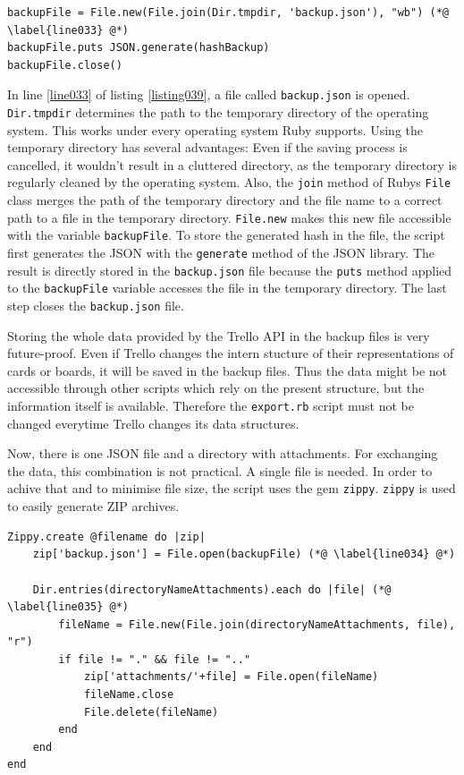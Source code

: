 \begin{lstlisting}[aboveskip=1\baselineskip, caption=Using the temporary directory of the operating system to save the JSON to file., label=listing039]
backupFile = File.new(File.join(Dir.tmpdir, 'backup.json'), "wb") (*@ \label{line033} @*)
backupFile.puts JSON.generate(hashBackup)
backupFile.close()
\end{lstlisting}

In line \ref{line033} of listing \ref{listing039}, a file called \texttt{backup.json} is opened. \lstinline{Dir.tmpdir} determines the path to the temporary directory of the operating system. This works under every operating system Ruby supports. Using the temporary directory has several advantages: Even if the saving process is cancelled, it wouldn't result in a cluttered directory, as the temporary directory is regularly cleaned by the operating system. Also, the \lstinline{join} method of Rubys \lstinline{File} class merges the path of the temporary directory and the file name to a correct path to a file in the temporary directory. \lstinline{File.new} makes this new file accessible with the variable \lstinline{backupFile}. To store the generated hash in the file, the script first generates the JSON with the \lstinline{generate} method of the JSON library. The result is directly stored in the \texttt{backup.json} file because the \lstinline{puts} method applied to the \lstinline{backupFile} variable accesses the file in the temporary directory. The last step closes the \texttt{backup.json} file.

Storing the whole data provided by the Trello API in the backup files is very future-proof. Even if Trello changes the intern stucture of their representations of cards or boards, it will be saved in the backup files. Thus the data might be not accessible through other scripts which rely on the present structure, but the information itself is available. Therefore the \texttt{export.rb} script must not be changed everytime Trello changes its data structures.

Now, there is one JSON file and a directory with attachments. For exchanging the data, this combination is not practical. A single file is needed. In order to achive that and to minimise file size, the script uses the gem \texttt{zippy}. \texttt{zippy} is used to easily generate ZIP archives. 

\begin{lstlisting}[aboveskip=1\baselineskip, caption=Creating a ZIP archive out of the backed up data., label=listing040]
Zippy.create @filename do |zip|
	zip['backup.json'] = File.open(backupFile) (*@ \label{line034} @*)

	Dir.entries(directoryNameAttachments).each do |file| (*@ \label{line035} @*)
		fileName = File.new(File.join(directoryNameAttachments, file), "r") 
		if file != "." && file != ".."
			zip['attachments/'+file] = File.open(fileName)
			fileName.close
			File.delete(fileName)
		end
	end
end
\end{lstlisting}

